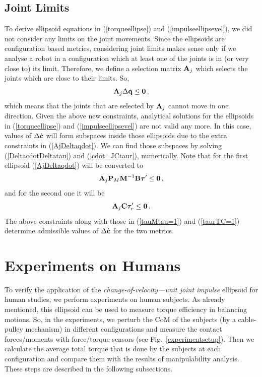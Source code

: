\subsection{Joint Limits}
\label{subsec:limits}

To derive ellipsoid equations in (\ref{torqueellipse}) and
(\ref{impulseellipsevel}), we did not consider any limits on the joint
movements.  Since the ellipsoids are configuration based metrics, considering
joint limits makes sense only if we analyse a robot in a configuration which
at least one of the joints is in (or very close to) its limit.  Therefore, we
define a selection matrix $\mathbf{A}_j$ which selects the joints which are close to
their limits.  So,
%
\begin{equation}
  \mathbf{A}_j \Delta \dot{\mathbf{q}} \leq \mathbf{0} \, ,
  \label{AjDeltaqdot}
\end{equation}
%
which means that the joints that are selected by $\mathbf{A}_j$ cannot move in one
direction.  Given the above new constraints, analytical solutions for the
ellipsoids in (\ref{torqueellipse}) and (\ref{impulseellipsevel}) are not
valid any more.  In this case, values of $\Delta \dot{\mathbf{c}}$ will form
subspaces inside those ellipsoids due to the extra constraints in
(\ref{AjDeltaqdot}).  We can find those subspaces by solving
(\ref{DeltacdotDeltatau}) and (\ref{cdot=JCtaur}), numerically.  Note that for
the first ellipsoid (\ref{AjDeltaqdot}) will be converted to
%
\begin{equation}
  \mathbf{A}_j \mathbf{P}_M \mathbf{M}^{-1} \mathbf{B} \boldsymbol{\tau}' \leq \mathbf{0} \, ,
\end{equation}
%
and for the second one it will be
%
\begin{equation}
  \mathbf{A}_j \mathbf{C} \boldsymbol{\tau}'_r \leq \mathbf{0} \, .
\end{equation}
%
The above constraints along with those in (\ref{tauMtau=1}) and
(\ref{taurTC=1}) determine admissible values of $\Delta \dot{\mathbf{c}}$ for the two
metrics.


\section{Experiments on Humans}
\label{sec:Exp}

To verify the application of the \textit{change-of-velocity---unit joint
  impulse} ellipsoid for human studies, we perform experiments on human
subjects.  As already mentioned, this ellipsoid can be used to measure torque
efficiency in balancing motions.  So, in the experiments, we perturb the CoM
of the subjects (by a cable-pulley mechanism) in different configurations and
measure the contact forces/moments with force/torque sensors (see
Fig.~\ref{experimentsetup}).  Then we calculate the average total torque that
is done by the subjects at each configuration and compare them with the
results of manipulability analysis.  These steps are described in the
following subsections.

